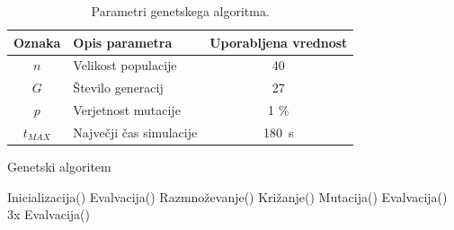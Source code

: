 \begin{table}[ht]
	\begin{center}
		\begin{tabular}{ c|l|c }
			\hline
			\textbf{Oznaka} & \textbf{Opis parametra} & \textbf{Uporabljena vrednost} \\ \hline  
			$n$ & Velikost populacije & 40 \\ 
			$G$ & Število generacij & 27 \\
			$p$ & Verjetnost mutacije & 1 \% \\
			$t_{MAX}$ & Največji čas simulacije & 180~s \\
			\hline
		\end{tabular}
	\end{center}
	\caption[Parametri genetskega algoritma]{Parametri genetskega algoritma.}
	\label{table:genetski}
\end{table}

\begin{algorithm}
	\caption{Genetski algoritem} 
	\begin{algorithmic}[1]
		\State Inicializacija()
		\State Evalvacija()
			\State Razmnoževanje()
			\State Križanje()
			\State Mutacija()
				\State Evalvacija()
			\Else
				\State 3x Evalvacija()
			\EndIf
		\EndFor
	\end{algorithmic} 
	\label{alg:genetski}
\end{algorithm}
